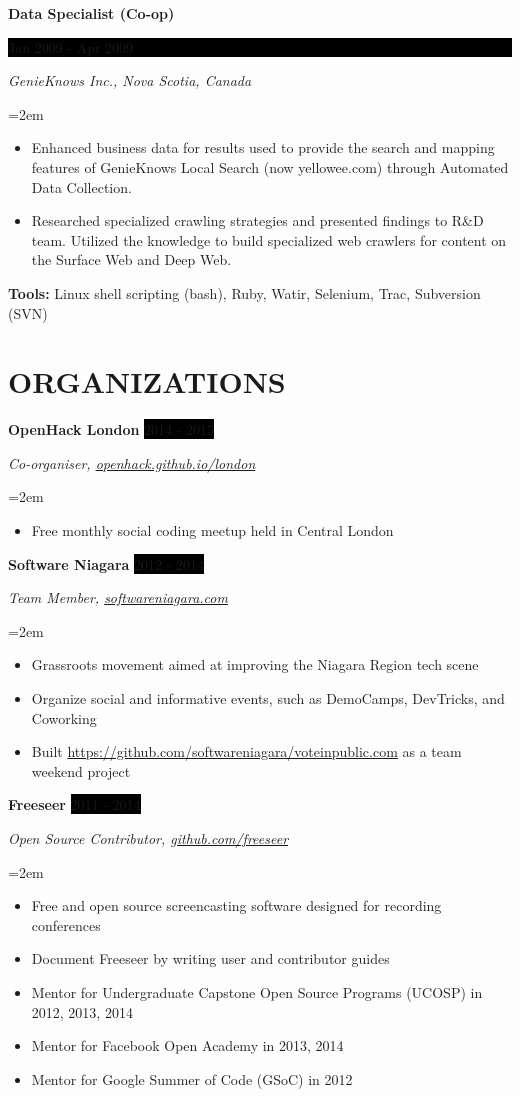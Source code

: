 \documentclass[paper=a4,fontsize=11pt]{scrartcl} %
\newcommand{\sepspace}{\vspace*{1em}}     %
\newcommand{\NewPart}[1]{\section*{\uppercase{#1}}}
\newcommand{\EducationEntry}[4]{
    \noindent \textbf{#1} \hfill        %
    \colorbox{Black}{
      \parbox{8.5em}{
      \hfill\color{White}#2}} \par      %
    \noindent \textit{#3} \par          %
    \noindent\hangindent=2em\hangafter=0 \small #4 %
    \normalsize \par}
\newcommand{\WorkEntry}[4]{             %
    \noindent \textbf{#1} \hfill        %
    \colorbox{Black}{%
      \parbox{9em}{%
      \hfill\color{White}#2}} \par      %
        \noindent \textit{#3} \par      %
    \noindent\hangindent=2em\hangafter=0 \small #4 %
    \normalsize \par}
\newcommand{\OrganizationEntry}[4]{         %
    \noindent \textbf{#1} \hfill            %
    \colorbox{Black}{\color{White}#2} \par  %
    \noindent \textit{#3} \par              %
    \noindent\hangindent=2em\hangafter=0 \small #4 %
    \normalsize \par}
\begin{document}
\WorkEntry{Data Specialist (Co-op)}{Jan 2009 - Apr 2009}
{GenieKnows Inc., Nova Scotia, Canada}
{
 \begin{itemize} \itemsep -1pt
   \item Enhanced business data for results used to provide the search and
         mapping features of GenieKnows Local Search (now yellowee.com)
         through Automated Data Collection.
   \item Researched specialized crawling strategies and presented findings to
         R\&D team. Utilized the knowledge to build specialized web
         crawlers for content on the Surface Web and Deep Web.
 \end{itemize}
 \textbf{Tools:} Linux shell scripting (bash), Ruby, Watir, Selenium, Trac, Subversion (SVN)
}

\NewPart{Organizations}{}

\OrganizationEntry{OpenHack London}{2014 - 2015} %
{Co-organiser, \href{https://openhack.github.io/london/}{openhack.github.io/london}}
{
  \begin{itemize} \itemsep -1pt
    \item Free monthly social coding meetup held in Central London
  \end{itemize}
}
\sepspace

\OrganizationEntry{Software Niagara}{2012 - 2014}
{Team Member, \href{https://www.softwareniagara.com/}{softwareniagara.com}}
{
 \begin{itemize} \itemsep -1pt
   \item Grassroots movement aimed at improving the Niagara Region tech scene
   \item Organize social and informative events, such as DemoCamps, DevTricks, and Coworking
   \item Built \url{https://github.com/softwareniagara/voteinpublic.com} as a team weekend project
 \end{itemize}
}
\sepspace

\OrganizationEntry{Freeseer}{2011 - 2014}
{Open Source Contributor, \url{github.com/freeseer}}
{
 \begin{itemize} \itemsep -1pt %
   \item Free and open source screencasting software designed for recording conferences
   \item Document Freeseer by writing user and contributor guides
   \item Mentor for Undergraduate Capstone Open Source Programs (UCOSP) in 2012, 2013, 2014
   \item Mentor for Facebook Open Academy in 2013, 2014
   \item Mentor for Google Summer of Code (GSoC) in 2012
 \end{itemize}
}
\sepspace
\end{document}
